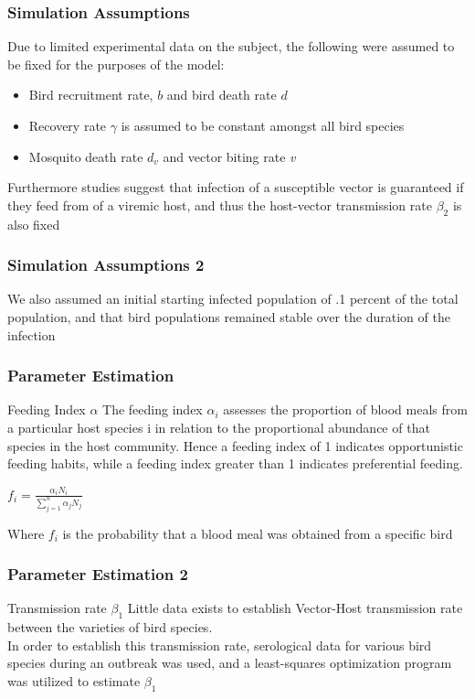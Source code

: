 \documentclass{beamer}
\begin{document}
\begin{frame}
\frametitle{Simulation Assumptions}
\begin{block}{}
Due to limited experimental data on the subject, the following were assumed to be fixed for the purposes of the model:
\begin{itemize}
\item Bird recruitment rate, $\textit{b}$ and bird death rate $\textit{d}$ 
\item Recovery rate $\gamma$ is assumed to be constant amongst all bird species
\item Mosquito death rate $d_v$ and vector biting rate \textit{v} 
\end{itemize}
Furthermore studies suggest that infection of a susceptible vector is guaranteed if they feed from of a viremic host, and thus the host-vector transmission rate $\beta_2$ is also fixed
\end{block}
\end{frame}

\begin{frame}
\frametitle{Simulation Assumptions 2}
\begin{block}{}
We also assumed an initial starting infected population of .1 percent of the total population, and that bird populations remained stable over the duration of the infection
\end{block}
\end{frame}

\begin{frame}
\frametitle{Parameter Estimation}
\begin{block}{Feeding Index $\alpha$}
The feeding index $\alpha_i$ assesses the proportion of blood meals from a particular host species i in relation to the proportional abundance of that species in the host community.  Hence a feeding index of 1 indicates opportunistic feeding habits, while a feeding index greater than 1 indicates preferential feeding. \\
\begin{center}
\huge $f_i= \frac{\alpha_iN_i}{\sum\limits_{j=1}^n\alpha_jN_j}$ 
\end{center}
Where $f_i$ is the probability that a blood meal was obtained from a specific bird
\end{block}
\end{frame}

\begin{frame}
\frametitle{Parameter Estimation 2}
\begin{block}{Transmission rate $\beta_1$}
Little data exists to establish Vector-Host transmission rate between the varieties of bird species. \\
In order to establish this transmission rate, serological data for various bird species during an outbreak was used, and a least-squares optimization program was utilized to estimate $\beta_1$
\end{block}
\end{frame}
\end{document}

